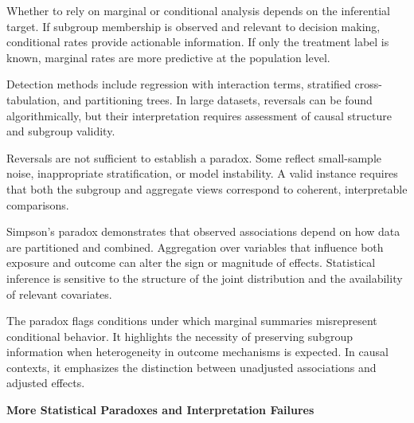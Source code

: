 Whether to rely on marginal or conditional analysis depends on the inferential target. If subgroup membership is observed and relevant to decision making, conditional rates provide actionable information. If only the treatment label is known, marginal rates are more predictive at the population level.

Detection methods include regression with interaction terms, stratified cross-tabulation, and partitioning trees. In large datasets, reversals can be found algorithmically, but their interpretation requires assessment of causal structure and subgroup validity.

Reversals are not sufficient to establish a paradox. Some reflect small-sample noise, inappropriate stratification, or model instability. A valid instance requires that both the subgroup and aggregate views correspond to coherent, interpretable comparisons.

Simpson’s paradox demonstrates that observed associations depend on how data are partitioned and combined. Aggregation over variables that influence both exposure and outcome can alter the sign or magnitude of effects. Statistical inference is sensitive to the structure of the joint distribution and the availability of relevant covariates.

The paradox flags conditions under which marginal summaries misrepresent conditional behavior. It highlights the necessity of preserving subgroup information when heterogeneity in outcome mechanisms is expected. In causal contexts, it emphasizes the distinction between unadjusted associations and adjusted effects.


\vspace*{\fill}

\clearpage



\begin{center}
{\Large \textbf{More Statistical Paradoxes and Interpretation Failures}}

\end{center}

\vspace{1em}

